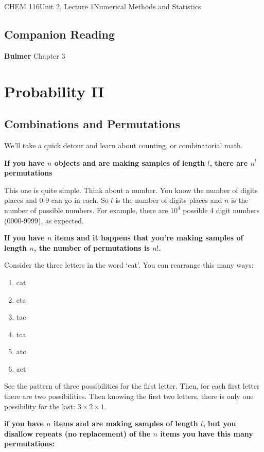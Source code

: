 \documentclass{article}
\begin{document}
\begin{tdoc}{CHEM 116}{Unit 2, Lecture 1}{Numerical Methods and Statistics}

  \subsection*{Companion Reading}
  \textbf{Bulmer} Chapter 3


  \section{Probability II}

  \subsection{Combinations and Permutations}

  We'll take a quick detour and learn about counting, or combinatorial math.

  {\bf If you have $n$ objects and are making samples of length $l$, there are $n^l$ permutations}

  This one is quite simple. Think about a number. You know the number
  of digits places and 0-9 can go in each. So $l$ is the number of
  digits places and $n$ is the number of possible numbers. For example, there
  are $10^4$ possible 4 digit numbers (0000-9999), as expected.

  {\bf  If you have $n$ items and it happens that you're making samples of length $n$, the number of permutations is $n!$. }

  Consider the three letters in the word `cat'. You can rearrange this many ways:

  \begin{enumerate}
  \item cat
  \item cta
  \item tac
  \item tca
  \item atc
  \item act
  \end{enumerate}

  See the pattern of three possibilities for the first letter. Then,
  for each first letter there are two possibilities. Then knowing the
  first two letters, there is only one possibility for the last: $3 \times 2 \times 1$.

  {\bf if you have $n$ items and are making samples of length $l$, but
    you disallow repeats (no replacement) of the $n$ items you have
    this many permutations:}


\end{tdoc}
\end{document}
